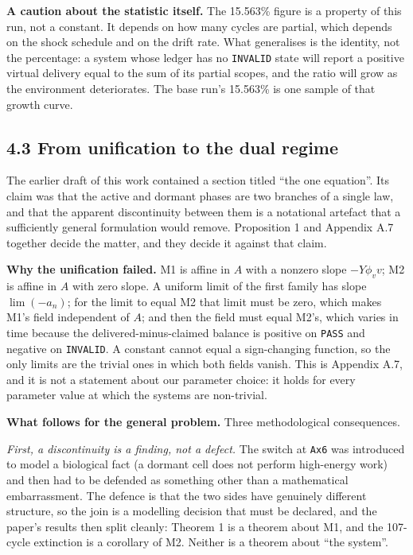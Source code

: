 \documentclass[11pt,a4paper]{article}
\begin{document}
\textbf{A caution about the statistic itself.} The 15.563\% figure is a property of this
run, not a constant. It depends on how many cycles are partial, which depends on
the shock schedule and on the drift rate. What generalises is the identity, not the
percentage: a system whose ledger has no \texttt{INVALID} state will report a positive
virtual delivery equal to the sum of its partial scopes, and the ratio will grow as
the environment deteriorates. The base run's 15.563\% is one sample of that growth
curve.

\subsection{4.3 From unification to the dual regime}\label{from-unification-to-the-dual-regime}

The earlier draft of this work contained a section titled ``the one equation''. Its
claim was that the active and dormant phases are two branches of a single law, and
that the apparent discontinuity between them is a notational artefact that a
sufficiently general formulation would remove. Proposition 1 and Appendix A.7
together decide the matter, and they decide it against that claim.

\textbf{Why the unification failed.} M1 is affine in \(A\) with a nonzero slope
\(-Y\phi_vv\); M2 is affine in \(A\) with zero slope. A uniform limit of the first
family has slope \(\lim(-a_n)\); for the limit to equal M2 that limit must be zero,
which makes M1's field independent of \(A\); and then the field must equal M2's,
which varies in time because the delivered-minus-claimed balance is positive on
\texttt{PASS} and negative on \texttt{INVALID}. A constant cannot equal a sign-changing function,
so the only limits are the trivial ones in which both fields vanish. This is
Appendix A.7, and it is not a statement about our parameter choice: it holds for
every parameter value at which the systems are non-trivial.

\textbf{What follows for the general problem.} Three methodological consequences.

\emph{First, a discontinuity is a finding, not a defect.} The switch at \texttt{Ax6} was
introduced to model a biological fact (a dormant cell does not perform
high-energy work) and then had to be defended as something other than a
mathematical embarrassment. The defence is that the two sides have genuinely
different structure, so the join is a modelling decision that must be declared, and
the paper's results then split cleanly: Theorem 1 is a theorem about M1, and the
107-cycle extinction is a corollary of M2. Neither is a theorem about ``the
system''.
\end{document}

